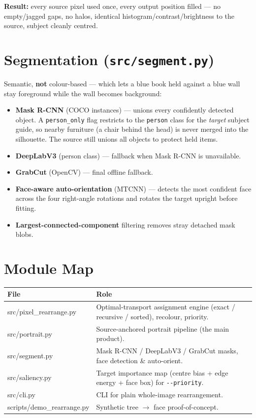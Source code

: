 \documentclass[11pt,a4paper]{article}
\begin{document}
\noindent
\textbf{Result:} every source pixel used once, every output position filled --- no
empty/jagged gaps, no halos, identical histogram/contrast/brightness to the source, subject
cleanly centred.

\section{Segmentation (\texttt{src/segment.py})}
Semantic, \textbf{not} colour-based --- which lets a blue book held against a blue wall stay
foreground while the wall becomes background:

\begin{itemize}[leftmargin=1.4em]
  \item \textbf{Mask R-CNN} (COCO instances) --- unions every confidently detected object. A
  \texttt{person\_only} flag restricts to the \texttt{person} class for the \emph{target}
  subject guide, so nearby furniture (a chair behind the head) is never merged into the
  silhouette. The source still unions all objects to protect held items.
  \item \textbf{DeepLabV3} (person class) --- fallback when Mask R-CNN is unavailable.
  \item \textbf{GrabCut} (OpenCV) --- final offline fallback.
  \item \textbf{Face-aware auto-orientation} (MTCNN) --- detects the most confident face across
  the four right-angle rotations and rotates the target upright before fitting.
  \item \textbf{Largest-connected-component} filtering removes stray detached mask blobs.
\end{itemize}

\section{Module Map}
\begin{center}
\begin{tabular}{@{}>{\ttfamily}l p{}@{}}
\toprule
\textnormal{\textbf{File}} & \textbf{Role} \\
\midrule
src/pixel\_rearrange.py & Optimal-transport assignment engine (exact / recursive / sorted), recolour, priority. \\
src/portrait.py & Source-anchored portrait pipeline (the main product). \\
src/segment.py & Mask R-CNN / DeepLabV3 / GrabCut masks, face detection \& auto-orient. \\
src/saliency.py & Target importance map (centre bias + edge energy + face box) for \texttt{-{}-priority}. \\
src/cli.py & CLI for plain whole-image rearrangement. \\
scripts/demo\_rearrange.py & Synthetic tree $\rightarrow$ face proof-of-concept. \\
\bottomrule
\end{tabular}
\end{center}
\end{document}
